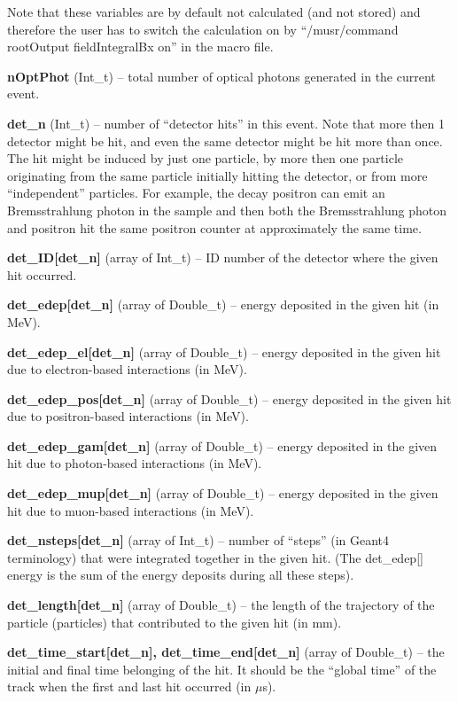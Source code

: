 \documentclass[twoside]{dis04}
\begin{document}
\begin{description}
	Note that these variables are by default not calculated (and not stored) and therefore the user has
	to switch the calculation on by ``/musr/command rootOutput fieldIntegralBx on'' in the macro file.
\item{\bf nOptPhot} (Int\_t) -- total number of optical photons generated in the current event.
\item{\bf det\_n} (Int\_t) -- number of ``detector hits'' in this event.  Note that more then 1 detector
        might be hit, and even the same detector might be hit more than once.  The hit might be induced by just one
        particle, by more then one particle originating from the same particle initially hitting the detector, 
	or from more ``independent'' particles.
    	For example, the decay positron can emit an Bremsstrahlung photon in the sample and then both the Bremsstrahlung
	photon and positron hit the same positron counter at approximately the same time.
\item{\bf det\_ID[det\_n]} (array of Int\_t) -- ID number of the detector where the given hit occurred.
\item{\bf det\_edep[det\_n]} (array of Double\_t) -- energy deposited in the given hit (in MeV).
\item{\bf det\_edep\_el[det\_n]} (array of  Double\_t) -- energy deposited in the given hit due to electron-based interactions (in MeV).
\item{\bf det\_edep\_pos[det\_n]} (array of Double\_t) -- energy deposited in the given hit due to positron-based interactions (in MeV).
\item{\bf det\_edep\_gam[det\_n]} (array of Double\_t) -- energy deposited in the given hit due to photon-based interactions (in MeV).
\item{\bf det\_edep\_mup[det\_n]} (array of Double\_t) -- energy deposited in the given hit due to muon-based interactions (in MeV).
\item{\bf det\_nsteps[det\_n]} (array of Int\_t) -- number of ``steps'' (in {\sc Geant4} terminology) that were 
	integrated together in the given hit. (The det\_edep[] energy is the sum of the energy deposits during all these steps).
\item{\bf det\_length[det\_n]} (array of Double\_t) -- the length of the trajectory of the particle (particles) that contributed to
        the given hit (in mm).
\item{\bf det\_time\_start[det\_n], det\_time\_end[det\_n]} (array of Double\_t) -- the initial and final time belonging of the hit.
	It should be the ``global time'' of the track when the first and last hit occurred (in $\mu$s).

\end{description}
\end{document}
